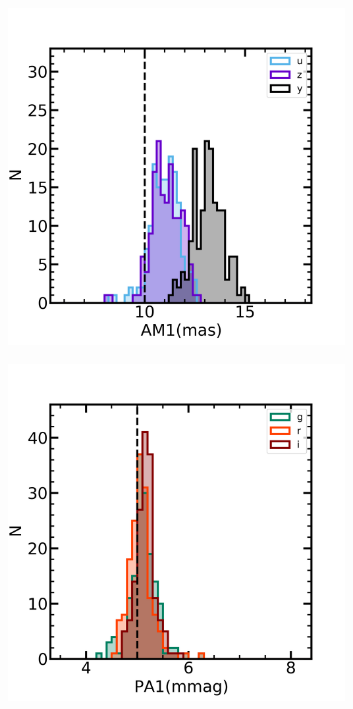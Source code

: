 \begin{figure}[!htp]
\begin{subfigure}{.5\textwidth}
    \includegraphics[width=0.98\textwidth]{figures/dp02_am1_alltracts_uzy}
\end{subfigure}
\begin{subfigure}{.5\textwidth}
    \includegraphics[width=0.98\textwidth]{figures/dp02_pa1_alltracts_gri}

\end{subfigure}
\end{figure}
